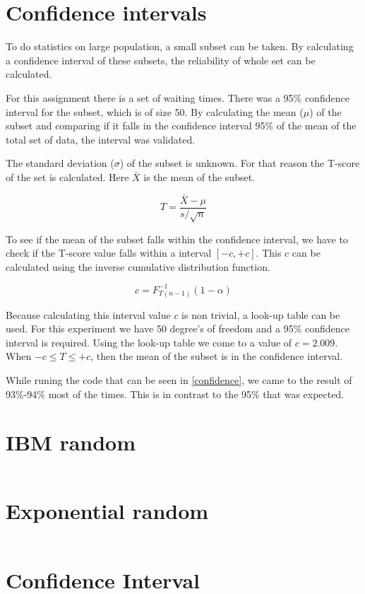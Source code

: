 \documentclass[a4paper,12px]{article}
\begin{document}
\section{Confidence intervals}

To do statistics on large population, a small subset can be taken. By
calculating a confidence interval of these subsets, the reliability of whole set
can be calculated.

For this assignment there is a set of waiting times. There was a 95\% confidence
interval for the subset, which is of size 50. By calculating the mean ($\mu$) of the
subset and comparing if it falls in the confidence interval 95\% of the mean of
the total set of data, the interval was validated.

The standard deviation ($\sigma$) of the subset is unknown. For that reason the
T-score of the set is calculated. Here $\bar{X}$ is the mean of the subset.

$$ T = \frac{\bar{X} - \mu}{s / \sqrt{n}} $$

To see if the mean of the subset falls within the confidence interval, we have
to check if the T-score value falls within a interval $[-c, +c]$. This $c$ can
be calculated using the inverse cumulative distribution function.

$$ c = F^{-1}_{T(n-1)} (1-\alpha) $$

Because calculating this interval value $c$ is non trivial, a look-up table can
be used. For this experiment we have 50 degree's of freedom and a 95\%
confidence interval is required. Using the look-up table we come to a value of
$c = 2.009$. When $-c \leq T \leq +c$, then the mean of the subset is in the
confidence interval.

While runing the code that can be seen in \autoref{confidence}, we came to the result
of 93\%-94\% most of the times. This is in contrast to the 95\% that was
expected.

\appendix
\section{IBM random}
\label{o22}
{\footnotesize\inputminted{python}{o22.py}}

\section{Exponential random}
\label{o3}
{\footnotesize\inputminted{python}{o3.py}}

\section{Confidence Interval}
\label{confidence}
{\footnotesize\inputminted{python}{confidence.py}}


% 
% 
\end{document}
